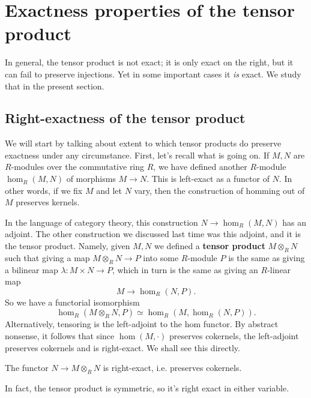 \section{Exactness properties of the tensor product}

In general, the tensor product is not exact; it is only exact on the right,
but it can fail to preserve injections. Yet in some important cases it \emph{is}
exact. We study that in the present section.

\subsection{Right-exactness of the tensor product}

We will start by talking about extent to which tensor products do preserve
exactness under any circumstance.
First, let's recall what is going on. If $M,N$ are $R$-modules over the
commutative ring $R$, we have defined another $R$-module $\hom_R(M,N)$ of morphisms
$M \to N$. This is left-exact as a functor of $N$. In other words, if we fix
$M$ and let $N$ vary, then the construction of homming out of $M$ preserves
kernels. 

In the language of category theory, this construction $N \to \hom_R(M,N)$ has
an adjoint. The other construction we discussed last time was this adjoint,
and it is  the tensor
product. Namely, given $M,N$ we defined a \textbf{tensor product} $M \otimes_R
N$ such that giving a map $M \otimes_R N \to P$ into some $R$-module $P$ is the same as giving a
bilinear map $\lambda: M \times N \to P$, which in turn is the same as giving
an $R$-linear map
\[ M \to \hom_R(N, P).  \]
So we have a functorial isomorphism
\[ \hom_R(M \otimes_R N, P) \simeq \hom_R(M, \hom_R(N,P)).  \]
Alternatively, tensoring is the left-adjoint to the
hom functor. By abstract nonsense, it follows that since $\hom(M, \cdot)$
preserves cokernels, the left-adjoint preserves cokernels and is right-exact.
We shall see this directly.

\begin{proposition} 
The functor $N \to M \otimes_R N$ is right-exact, i.e. preserves cokernels.
\end{proposition} 
In fact, the tensor product is symmetric, so it's right exact in either
variable. 

